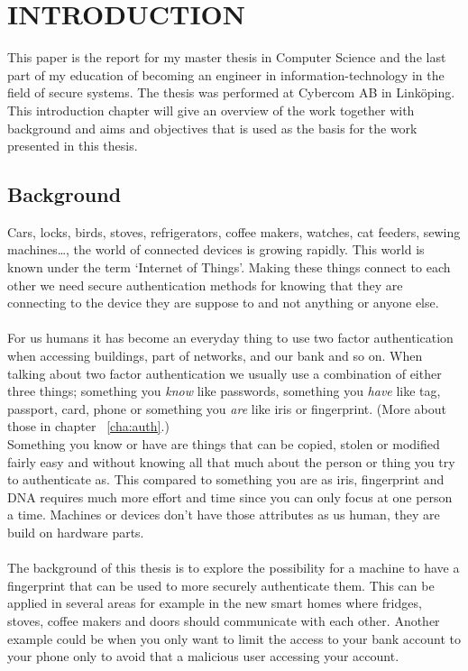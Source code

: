 \chapter{INTRODUCTION}\label{cha:intro}
This paper is the report for my master thesis in Computer Science and the last part of my education of becoming an engineer in information-technology in the field of secure systems. The thesis was performed at Cybercom AB in Linköping. \\
This introduction chapter will give an overview of the work together with background and aims and objectives that is used as the basis for the work presented in this thesis. 

\section{Background}\label{sec:bg}
Cars, locks, birds, stoves, refrigerators, coffee makers, watches, cat feeders, sewing machines\dots, the world of connected devices is growing rapidly. This world is known under the term `Internet of Things'. Making these things connect to each other we need secure authentication methods for knowing that they are connecting to the device they are suppose to and not anything or anyone else. \\
\\
For us humans it has become an everyday thing to use two factor authentication when accessing buildings, part of networks, and our bank and so on. When talking about two factor authentication we usually use a combination of either three things; something you \textit{know} like passwords, something you \textit{have} like tag, passport, card, phone or something you \textit{are} like iris or fingerprint. (More about those in chapter ~\ref{cha:auth}.)  \\
Something you know or have are things that can be copied, stolen or modified fairly easy and without knowing all that much about the person or thing you try to authenticate as. This compared to something you are as iris, fingerprint and DNA requires much more effort and time since you can only focus at one person a time. Machines or devices don't have those attributes as us human, they are build on hardware parts.\\ 
\\
The background of this thesis is to explore the possibility for a machine to have a fingerprint that can be used to more securely authenticate them. This can be applied in several areas for example in the new smart homes where fridges, stoves, coffee makers and doors should communicate with each other. Another example could be when you only want to limit the access to your bank account to your phone only to avoid that a malicious user accessing your account.

